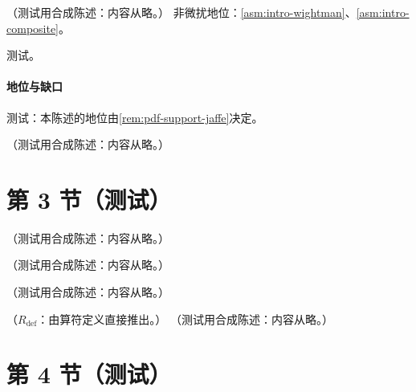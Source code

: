 \begin{proposition}\label{prop:pdf-support-hadron}
（测试用合成陈述：内容从略。）
非微扰地位：\cref{asm:intro-wightman}、\cref{asm:intro-composite}。
\end{proposition}
\begin{proofsketch}测试。\end{proofsketch}
\paragraph{地位与缺口}测试：本陈述的地位由\cref{rem:pdf-support-jaffe}决定。

\begin{remark}[支撑的第二种论证：$k^-$ 极点]\label{rem:pdf-support-jaffe}
（测试用合成陈述：内容从略。）
\end{remark}

\section{第 3 节（测试）}\label{sec:pdf-interpretation}

\begin{remark}\label{rem:pdf-number-density}
（测试用合成陈述：内容从略。）
\end{remark}

\begin{remark}[光锥规范的剩余规范自由与 $1/k^+$ 处方]\label{rem:pdf-gauge-residual}
（测试用合成陈述：内容从略。）
\end{remark}

\begin{definition}[光线算符]\label{def:pdf-lightray}
（测试用合成陈述：内容从略。）
\end{definition}

\begin{lemma}[Wilson 线顶点的矩 = 定域算符顶点 \tagR]\label{lem:pdf-wilson-moments}
（$R_{\mathrm{def}}$：由算符定义直接推出。）
（测试用合成陈述：内容从略。）
\end{lemma}

\section{第 4 节（测试）}\label{sec:pdf-moments}

